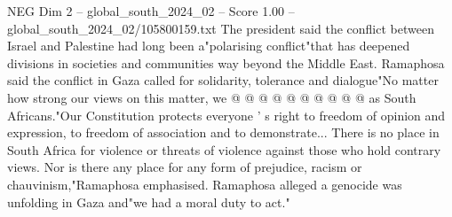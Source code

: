 \begin{textsample}{NEG Dim 2 – global\_south\_2024\_02 – Score 1.00 – global\_south\_2024\_02/105800159.txt}
The president said the conflict between Israel and Palestine had long been a"polarising conflict"that has deepened divisions in societies and communities way beyond the Middle East.
Ramaphosa said the conflict in Gaza called for solidarity, tolerance and dialogue"No matter how strong our views on this matter, we @ @ @ @ @ @ @ @ @ @ as South Africans."Our Constitution protects everyone ' s right to freedom of opinion and expression, to freedom of association and to demonstrate...
There is no place in South Africa for violence or threats of violence against those who hold contrary views.
Nor is there any place for any form of prejudice, racism or chauvinism,"Ramaphosa emphasised.
Ramaphosa alleged a genocide was unfolding in Gaza and"we had a moral duty to act."

\end{textsample}
